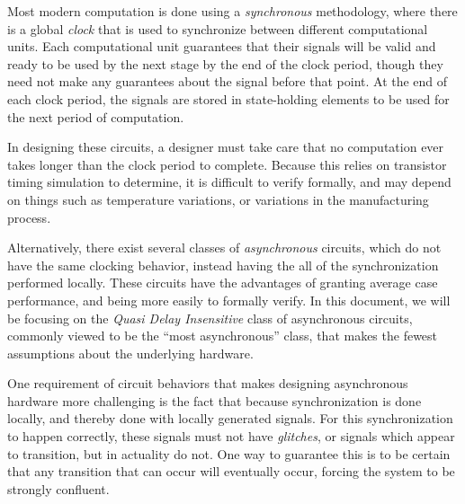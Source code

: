 \documentclass[times, 10pt]{article}
\begin{document}
Most modern computation is done using a {\it synchronous } methodology, where
there is a global {\it clock} that is used to synchronize between different
computational units.  Each computational unit guarantees that their signals will
be valid and ready to be used by the next stage by the end of the clock period,
though they need not make any guarantees about the signal before that point.  At
the end of each clock period, the signals are stored in state-holding elements
to be used for the next period of computation. 

In designing these circuits, a designer must take care that no computation ever
takes longer than the clock period to complete. Because this relies on
transistor timing simulation to determine, it is difficult to verify formally,
and may depend on things such as temperature variations, or variations in the
manufacturing process.


Alternatively, there exist several classes of {\it asynchronous} circuits, which
do not have the same clocking behavior, instead having the all of the
synchronization performed locally. These circuits have the advantages of
granting average case performance, and being more easily to formally verify. In
this document, we will be focusing on the {\it Quasi Delay Insensitive} class of
asynchronous circuits, commonly viewed to be the ``most asynchronous'' class,
that makes the fewest assumptions about the underlying hardware.

One requirement of circuit behaviors that makes designing asynchronous hardware
more challenging is the fact that because synchronization is done locally, and
thereby done with locally generated signals. For this synchronization to happen
correctly, these signals must not have {\it glitches}, or signals which appear
to transition, but in actuality do not. One way to guarantee this is to be
certain that any transition that can occur will eventually occur, forcing the
system to be strongly confluent.
\end{document}
